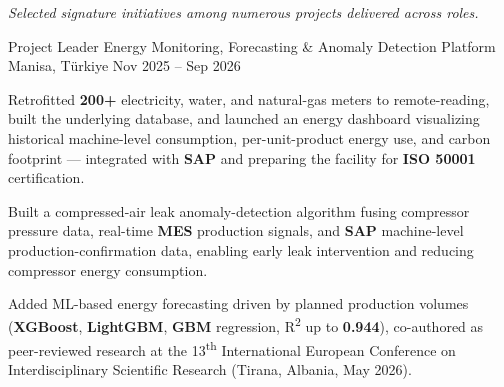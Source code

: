 
{\scriptsize\itshape\color{graytext}Selected signature initiatives among numerous projects delivered across roles.\par}
\vspace{-1mm}

\begin{cventries}

  \cventry
    {Project Leader} %
    {Energy Monitoring, Forecasting \& Anomaly Detection Platform} %
    {Manisa, Türkiye} %
    {Nov 2025 -- Sep 2026} %
    {
      \begin{cvitems} %
        \item {Retrofitted \textbf{200+} electricity, water, and natural-gas meters to remote-reading, built the underlying database, and launched an energy dashboard visualizing historical machine-level consumption, per-unit-product energy use, and carbon footprint --- integrated with \textbf{SAP} and preparing the facility for \textbf{ISO 50001} certification.}
        \item {Built a compressed-air leak anomaly-detection algorithm fusing compressor pressure data, real-time \textbf{MES} production signals, and \textbf{SAP} machine-level production-confirmation data, enabling early leak intervention and reducing compressor energy consumption.}
        \item {Added ML-based energy forecasting driven by planned production volumes (\textbf{XGBoost}, \textbf{LightGBM}, \textbf{GBM} regression, R\textsuperscript{2} up to \textbf{0.944}), co-authored as peer-reviewed research at the 13\textsuperscript{th} International European Conference on Interdisciplinary Scientific Research (Tirana, Albania, May 2026).}
      \end{cvitems}
    }


\end{cventries}
